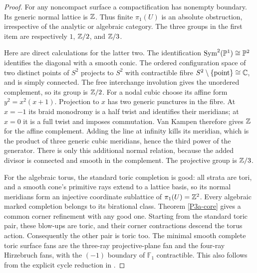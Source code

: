 \begin{proof}
For any noncompact surface a compactification has nonempty
boundary. Its generic normal lattice is $\mathbb Z$. Thus finite
$\pi _1(U)$ is an absolute obstruction, irrespective of the
analytic or algebraic category. The three groups in the first
item are respectively $1$, $\mathbb Z/2$, and $\mathbb Z/3$.

Here are direct calculations for the latter two. The identification
$\operatorname{Sym}^2(\mathbb P^1)\cong\mathbb P^2$ identifies the diagonal
with a smooth conic. The ordered configuration space of two
distinct points of $S^2$ projects to $S^2$ with contractible fibre
$S^2\setminus\{\mathrm{point}\}\cong\mathbb C$, and is simply connected.
The free interchange involution gives the unordered complement,
so its group is $\mathbb Z/2$. For a nodal cubic choose its affine form
$y^2=x^2(x+1)$. Projection to $x$ has two generic punctures in
the fibre. At $x=-1$ its braid monodromy is a half twist and
identifies their meridians; at $x=0$ it is a full twist and
imposes commutation. Van Kampen therefore gives $\mathbb Z$ for the
affine complement. Adding the line at infinity kills its
meridian, which is the product of three generic cubic meridians,
hence the third power of the generator. There is only this
additional normal relation, because the added divisor is
connected and smooth in the complement. The projective group
is $\mathbb Z/3$.

For the algebraic torus, the standard toric completion is good:
all strata are tori, and a smooth cone's primitive rays extend
to a lattice basis, so its normal meridians form an injective
coordinate sublattice of $\pi _1(U)=\mathbb Z^2$. Every algebraic marked
completion belongs to its birational class. Theorem
\ref{P3a-core} gives a common corner refinement with any good one.
Starting from the standard toric pair, these blow-ups are toric,
and their corner contractions descend the torus action.
Consequently the other pair is toric too. The minimal smooth
complete toric surface fans are the three-ray projective-plane
fan and the four-ray Hirzebruch fans, with the $(-1)$ boundary
of $\mathbb F_1$ contractible. This also follows from the explicit
cycle reduction in \citet[Proposition~3, pp.~89--90]{Ueda1979}.


\end{proof}
